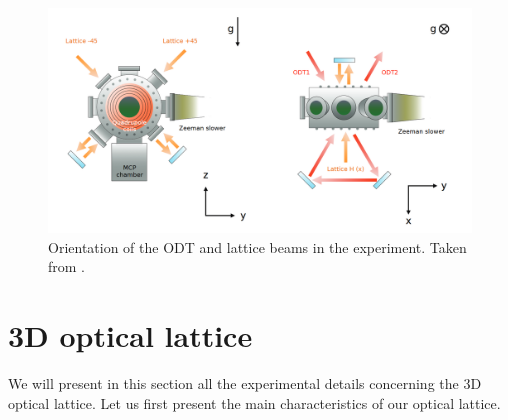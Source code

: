 \begin{figure}
    \centering
    \includegraphics[width=\textwidth]{Fig/Chapter3/scheme_odt_lattice.png}
    \caption{Orientation of the ODT and lattice beams in the experiment. Taken from \cite{cayla_these}.}
    \label{fig:scheme_odt_lattice}
\end{figure}

\section{3D optical lattice}

We will present in this section all the experimental details concerning the 3D optical lattice. Let us first present the main characteristics of our optical lattice.

